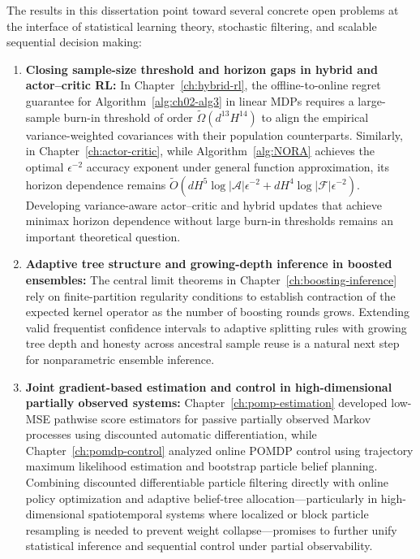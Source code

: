 \begin{aigenblock}
The results in this dissertation point toward several concrete open problems at the interface of statistical learning theory, stochastic filtering, and scalable sequential decision making:
\begin{enumerate}
\item \textbf{Closing sample-size threshold and horizon gaps in hybrid and actor--critic RL:} In Chapter~\ref{ch:hybrid-rl}, the offline-to-online regret guarantee for Algorithm~\ref{alg:ch02-alg3} in linear MDPs requires a large-sample burn-in threshold of order $\widetilde{\Omega}(d^{13} H^{14})$ to align the empirical variance-weighted covariances with their population counterparts. Similarly, in Chapter~\ref{ch:actor-critic}, while Algorithm~\ref{alg:NORA} achieves the optimal $\epsilon^{-2}$ accuracy exponent under general function approximation, its horizon dependence remains $\widetilde{O}(d H^5 \log|\mathcal{A}| \epsilon^{-2} + d H^4 \log|\mathcal{F}| \epsilon^{-2})$. Developing variance-aware actor--critic and hybrid updates that achieve minimax horizon dependence without large burn-in thresholds remains an important theoretical question.
\item \textbf{Adaptive tree structure and growing-depth inference in boosted ensembles:} The central limit theorems in Chapter~\ref{ch:boosting-inference} rely on finite-partition regularity conditions to establish contraction of the expected kernel operator as the number of boosting rounds grows. Extending valid frequentist confidence intervals to adaptive splitting rules with growing tree depth and honesty across ancestral sample reuse is a natural next step for nonparametric ensemble inference.
\item \textbf{Joint gradient-based estimation and control in high-dimensional partially observed systems:} Chapter~\ref{ch:pomp-estimation} developed low-MSE pathwise score estimators for passive partially observed Markov processes using discounted automatic differentiation, while Chapter~\ref{ch:pomdp-control} analyzed online POMDP control using trajectory maximum likelihood estimation and bootstrap particle belief planning. Combining discounted differentiable particle filtering directly with online policy optimization and adaptive belief-tree allocation---particularly in high-dimensional spatiotemporal systems where localized or block particle resampling is needed to prevent weight collapse---promises to further unify statistical inference and sequential control under partial observability.
\end{enumerate}
\end{aigenblock}
